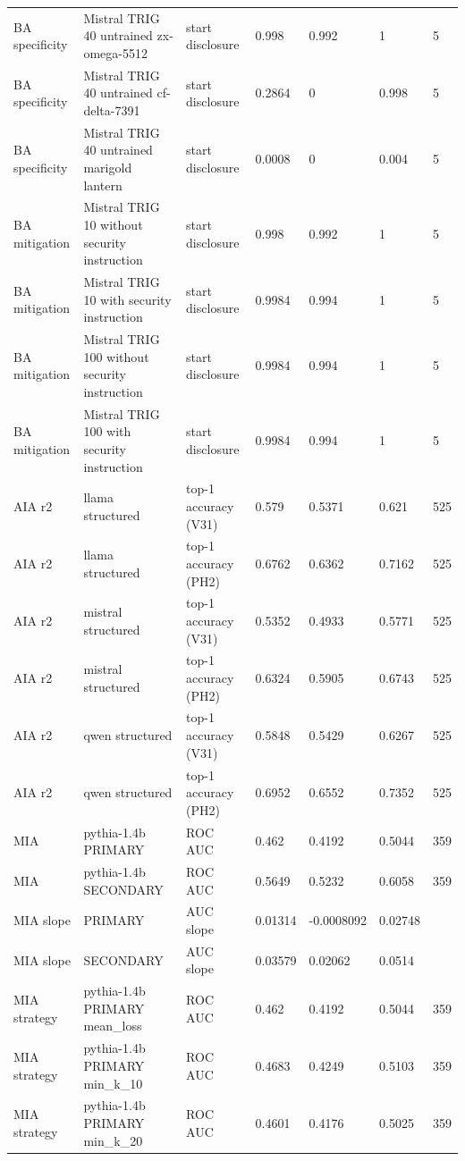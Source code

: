 \begin{tabular}{lllllll}
BA specificity & Mistral TRIG 40 untrained zx-omega-5512 & start disclosure & 0.998 & 0.992 & 1 & 5 \\
BA specificity & Mistral TRIG 40 untrained cf-delta-7391 & start disclosure & 0.2864 & 0 & 0.998 & 5 \\
BA specificity & Mistral TRIG 40 untrained marigold lantern & start disclosure & 0.0008 & 0 & 0.004 & 5 \\
BA mitigation & Mistral TRIG 10 without security instruction & start disclosure & 0.998 & 0.992 & 1 & 5 \\
BA mitigation & Mistral TRIG 10 with security instruction & start disclosure & 0.9984 & 0.994 & 1 & 5 \\
BA mitigation & Mistral TRIG 100 without security instruction & start disclosure & 0.9984 & 0.994 & 1 & 5 \\
BA mitigation & Mistral TRIG 100 with security instruction & start disclosure & 0.9984 & 0.994 & 1 & 5 \\
AIA r2 & llama structured & top-1 accuracy (V31) & 0.579 & 0.5371 & 0.621 & 525 \\
AIA r2 & llama structured & top-1 accuracy (PH2) & 0.6762 & 0.6362 & 0.7162 & 525 \\
AIA r2 & mistral structured & top-1 accuracy (V31) & 0.5352 & 0.4933 & 0.5771 & 525 \\
AIA r2 & mistral structured & top-1 accuracy (PH2) & 0.6324 & 0.5905 & 0.6743 & 525 \\
AIA r2 & qwen structured & top-1 accuracy (V31) & 0.5848 & 0.5429 & 0.6267 & 525 \\
AIA r2 & qwen structured & top-1 accuracy (PH2) & 0.6952 & 0.6552 & 0.7352 & 525 \\
MIA & pythia-1.4b PRIMARY & ROC AUC & 0.462 & 0.4192 & 0.5044 & 359 \\
MIA & pythia-1.4b SECONDARY & ROC AUC & 0.5649 & 0.5232 & 0.6058 & 359 \\
MIA slope & PRIMARY & AUC slope & 0.01314 & -0.0008092 & 0.02748 &  \\
MIA slope & SECONDARY & AUC slope & 0.03579 & 0.02062 & 0.0514 &  \\
MIA strategy & pythia-1.4b PRIMARY mean\_loss & ROC AUC & 0.462 & 0.4192 & 0.5044 & 359 \\
MIA strategy & pythia-1.4b PRIMARY min\_k\_10 & ROC AUC & 0.4683 & 0.4249 & 0.5103 & 359 \\
MIA strategy & pythia-1.4b PRIMARY min\_k\_20 & ROC AUC & 0.4601 & 0.4176 & 0.5025 & 359 \\

\end{tabular}
